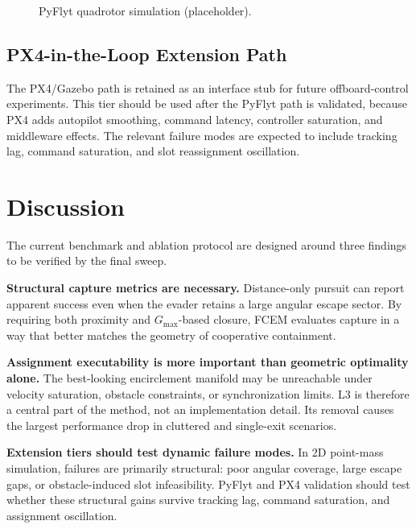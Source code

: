 \documentclass[journal]{IEEEtran}
\newcommand{\Gmax}{G_{\max}}
\begin{document}
\begin{figure}[!t]
  \centering
  \caption{PyFlyt quadrotor simulation (placeholder).}
  \label{fig:pyflyt}
\end{figure}

\subsection{PX4-in-the-Loop Extension Path}
\label{sec:px4}

The PX4/Gazebo path is retained as an interface stub for future offboard-control experiments.
This tier should be used after the PyFlyt path is validated, because PX4 adds autopilot smoothing, command latency, controller saturation, and middleware effects.
The relevant failure modes are expected to include tracking lag, command saturation, and slot reassignment oscillation.

\section{Discussion}
\label{sec:discussion}

The current benchmark and ablation protocol are designed around three findings to be verified by the final sweep.

\textbf{Structural capture metrics are necessary.}
Distance-only pursuit can report apparent success even when the evader retains a large angular escape sector.
By requiring both proximity and $\Gmax$-based closure, FCEM evaluates capture in a way that better matches the geometry of cooperative containment.

\textbf{Assignment executability is more important than geometric optimality alone.}
The best-looking encirclement manifold may be unreachable under velocity saturation, obstacle constraints, or synchronization limits.
L3 is therefore a central part of the method, not an implementation detail.
Its removal causes the largest performance drop in cluttered and single-exit scenarios.

\textbf{Extension tiers should test dynamic failure modes.}
In 2D point-mass simulation, failures are primarily structural: poor angular coverage, large escape gaps, or obstacle-induced slot infeasibility.
PyFlyt and PX4 validation should test whether these structural gains survive tracking lag, command saturation, and assignment oscillation.
\end{document}
